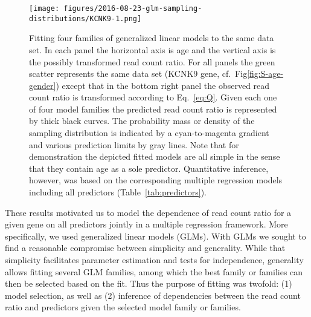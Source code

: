 \documentclass[letterpaper]{article}
\begin{document}
\begin{figure}
\begin{center}
\texttt{[image: figures/2016-08-23-glm-sampling-distributions/KCNK9-1.png]}
\end{center}
\caption{Fitting four families of generalized linear models to the same data
set.  In each panel the horizontal axis is age and the vertical axis is the
possibly transformed read count ratio.  For all panels the green scatter
represents the same data set (KCNK9 gene, cf.~Fig\ref{fig:S-age-gender})
except that in the bottom right panel the observed read count ratio is
transformed according to Eq.~\ref{eq:Q}.  Given each one of four model
families the predicted read count ratio is represented by thick black curves.
The probability mass or density of the sampling distribution is indicated by a
cyan-to-magenta gradient and various prediction limits by gray lines.  Note
that for demonstration the depicted fitted models are all simple in the sense
that they contain age as a sole predictor.  Quantitative inference, however,
was based on the corresponding multiple regression models including all
predictors (Table~\ref{tab:predictors}).
  }
\label{fig:predicted-curves}
\end{figure}

These results motivated us to model the dependence of read count ratio for a
given gene on all predictors jointly in a multiple regression framework.  More
specifically, we used generalized linear models (GLMs).  With GLMs we sought
to find a reasonable compromise between simplicity and generality.  While that
simplicity facilitates parameter estimation and tests for independence,
generality allows fitting several GLM families, among which the best family or
families can then be selected based on the fit.  Thus the purpose of fitting
was twofold: (1) model selection, as well as (2) inference of dependencies
between the read count ratio and predictors given the selected model family or
families.
\end{document}
